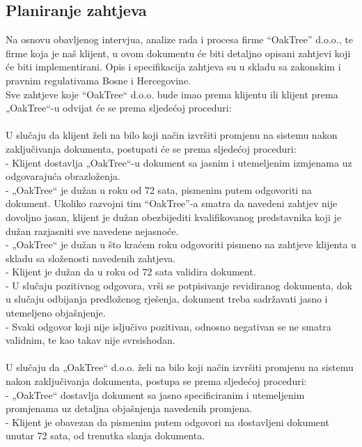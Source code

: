 \documentclass[utf8]{article}
\begin{document}
\subsection{Planiranje zahtjeva}
Na osnovu obavljenog intervjua, analize rada i procesa firme “OakTree” d.o.o., te firme koja je naš klijent, u ovom dokumentu će biti detaljno opisani zahtjevi koji će biti implementirani. Opis i specifikacija zahtjeva su u skladu sa zakonskim i pravnim regulativama Bosne i Hercegovine.\\
Sve zahtjeve koje “OakTree“ d.o.o. bude imao prema klijentu ili klijent prema „OakTree“-u odvijat će se prema sljedećoj proceduri:\\
\\
U slučaju da klijent želi na bilo koji način izvršiti promjenu na sistemu nakon zaključivanja dokumenta, postupati će se prema sljedećoj proceduri: \\
 - Klijent dostavlja „OakTree“-u dokument sa jasnim i utemeljenim izmjenama uz odgovarajuća obrazloženja.  \\
- „OakTree“ je dužan u roku od 72 sata, pismenim putem odgovoriti na dokument.  Ukoliko razvojni tim “OakTree”-a smatra da navedeni zahtjev nije dovoljno jasan, klijent je dužan obezbijediti kvalifikovanog predstavnika koji je dužan razjasniti sve navedene nejasnoće.  \\
- „OakTree“ je dužan u što kraćem roku odgovoriti pismeno na zahtjeve klijenta u skladu sa složenosti navedenih zahtjeva.\\
  - Klijent je dužan da u roku od 72 sata validira dokument.\\
 - U slučaju pozitivnog odgovora, vrši se potpisivanje revidiranog dokumenta, dok u slučaju odbijanja predloženog rješenja, dokument treba sadržavati jasno i utemeljeno objašnjenje.  \\
- Svaki odgovor koji nije isljučivo pozitivan, odnosno negativan se ne smatra validnim, te kao takav nije svrsishodan. \\
\\
U slučaju da „OakTree“ d.o.o. želi na bilo koji način izvršiti promjenu na sistemu nakon zaključivanja dokumenta, postupa se prema sljedećoj proceduri:  \\
- „OakTree“ dostavlja dokument sa jasno specificiranim i utemeljenim promjenama uz detaljna objašnjenja navedenih promjena. \\
- Klijent je obavezan da pismenim putem odgovori na dostavljeni dokument unutar 72 sata, od trenutka slanja dokumenta.  \\
\end{document}
